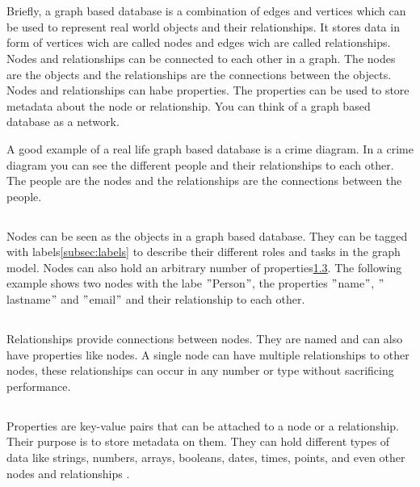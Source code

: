 
\section{}
Briefly, a graph based database is a combination of edges and vertices which  can be used to represent real world
objects and their relationships.
It stores data in form of vertices wich are called nodes and edges wich are called relationships.
Nodes and relationships can be connected to each other in a graph.
The nodes are the objects and the relationships are the connections between the objects.
Nodes and relationships can habe properties.
The properties can be used to store metadata about the node or relationship.\cite[P. 6f. ]{PractivalNeo4j}
You can think of a graph based database as a network.

A good example of a real life graph based database is a crime diagram.
In a crime diagram you can see the different people and their relationships to each other.
The people are the nodes and the relationships are the connections between the people. \cite[compare P. 6f. ]{BeginningNeo4j}

\subsection{}
Nodes can be seen as the objects in a graph based database.
They can be tagged with labels\ref{subsec:labels} to describe their different roles and tasks in the graph model.
Nodes can also hold an arbitrary number of properties\ref{subsec:tbd{properties}}.
The following example shows two nodes with the labe \("\)Person\("\), the properties \("\)name\("\), \("\)lastname\("\)
and \("\)email\("\) and their relationship to each other\cite[compare P. 6f. ]{PractivalNeo4j}.
\subsection{}\label{subsec:tbd{relationships}}
Relationships provide connections between nodes.
They are named and can also have properties like nodes.
A single node can have multiple relationships to other nodes, these relationships can occur in any number or type without
sacrificing performance\cite[compare ]{Neo4j:allgemeines}.
\subsection{} \label{subsec:tbd{properties}}
Properties are key-value pairs that can be attached to a node or a relationship.
Their purpose is to store metadata on them.
They can hold different types of data like strings, numbers, arrays, booleans, dates, times, points, and even other nodes and relationships \cite[compare ]{neo4j:Values} \cite[compare]{neo4j:Graph}.
